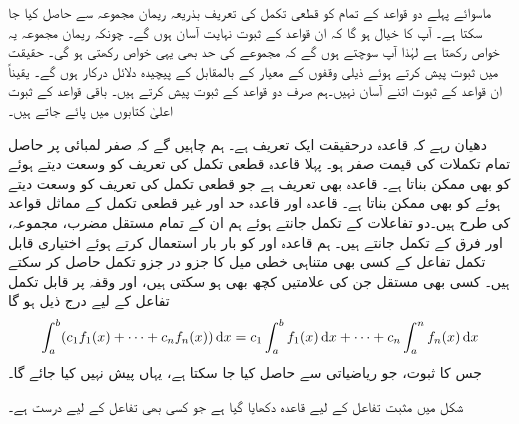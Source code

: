 ماسوائے پہلے دو قواعد کے تمام  کو قطعی تکمل کی تعریف بذریعہ ریمان مجموعہ سے حاصل کیا جا سکتا ہے۔ آپ کا خیال ہو گا کہ  ان قواعد کے ثبوت نہایت آسان ہوں گے۔ چونکہ ریمان مجموعہ یہ خواص رکھتا ہے لہٰذا آپ سوچتے ہوں گے کہ مجموعے  کی حد بھی یہی خواص رکھتی ہو گی۔ حقیقت میں  ثبوت پیش کرتے ہوئے ذیلی وقفوں کے معیار کے    بالمقابل    کے پیچیدہ دلائل درکار ہوں گے۔ یقیناً ان قواعد کے ثبوت اتنے آسان نہیں۔ہم صرف دو قواعد کے ثبوت پیش کرتے ہیں۔ باقی قواعد کے ثبوت  اعلیٰ کتابوں میں پائے جاتے ہیں۔

دھیان رہے کہ قاعدہ  درحقیقت ایک تعریف ہے۔ ہم چاہیں گے کہ صفر لمبائی پر حاصل  تمام تکملات کی قیمت صفر ہو۔ پہلا قاعدہ قطعی تکمل کی تعریف کو وسعت دیتے ہوئے     کو بھی ممکن بناتا ہے۔ قاعدہ  بھی تعریف ہے جو قطعی تکمل کی تعریف کو وسعت دیتے ہوئے    کو بھی ممکن بناتا ہے۔ قاعدہ  اور قاعدہ  حد اور غیر قطعی تکمل کے مماثل قواعد کی طرح ہیں۔دو تفاعلات کے تکمل جانتے ہوئے ہم ان کے تمام مستقل مضرب، مجموعہ، اور فرق  کے تکمل جانتے ہیں۔ ہم قاعدہ  اور  کو بار بار استعمال کرتے ہوئے اختیاری قابل تکمل تفاعل کے کسی بھی  متناہی خطی میل کا جزو در جزو تکمل حاصل کر سکتے ہیں۔ کسی بھی مستقل  جن کی علامتیں کچھ بھی ہو سکتی ہیں، اور وقفہ  پر قابل تکمل تفاعل  کے لیے درج ذیل ہو گا
\begin{align*}
\int_a^b(c_1f_1(x)+\cdots+c_nf_n(x))\dif x=c_1\int_a^bf_1(x)\dif x+\cdots+c_n\int_a^nf_n(x)\dif x
\end{align*}  
جس کا ثبوت، جو ریاضیاتی سے حاصل کیا جا سکتا ہے، یہاں پیش نہیں کیا جائے گا۔

شکل  میں مثبت تفاعل کے لیے قاعدہ  دکھایا گیا ہے جو کسی بھی تفاعل کے لیے درست ہے۔

